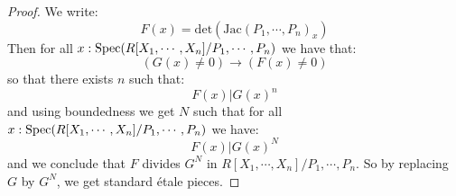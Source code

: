 \begin{proof}
    We write:
    \[F(x)=\mathrm{det}(\mathrm{Jac}(P_1,\cdots,P_n)_x)\]
    Then for all $x:\operatorname{Spec}(R[X_1,\cdots,X_n]/P_1,\cdots,P_n)$ we have that:
    \[(G(x)\not=0) \to (F(x)\not=0)\]
    so that there exists $n$ such that:
    \[F(x) | G(x)^n\]
    and using boundedness we get $N$ such that for all $x:\operatorname{Spec}(R[X_1,\cdots,X_n]/P_1,\cdots,P_n)$ we have:
    \[F(x) | G(x)^N\]
    and we conclude that $F$ divides $G^N$ in $R[X_1,\cdots,X_n]/P_1,\cdots,P_n$. So by replacing $G$ by $G^N$, we get standard étale pieces.
    
\end{proof}

